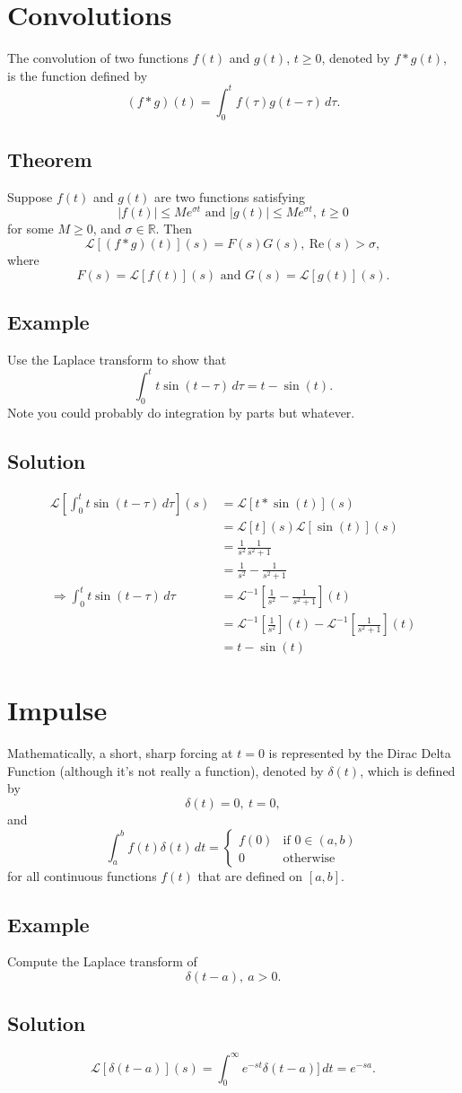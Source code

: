 \documentclass[11pt]{article}
\newcommand{\reals}{\mathbb{R}}
\newcommand{\Laplace}{\mathscr{L}}
\begin{document}
\section{Convolutions}
The convolution of two functions $f(t)$ and $g(t)$, $t \geq 0$, denoted by $f*g(t)$, is the function defined by
\[ (f*g)(t) = \int_0^t f(\tau) g(t - \tau)\, d\tau . \]

\subsection{Theorem}
Suppose $f(t)$ and $g(t)$ are two functions satisfying
\[ |f(t)| \leq Me^{\sigma t} \text{ and } |g(t)| \leq Me^{\sigma t},\ t \geq 0 \]
for some $M \geq 0$, and $\sigma \in \reals$. Then
\[ \Laplace[(f*g)(t)](s) = F(s)G(s),\ \text{Re}(s) > \sigma, \]
where
\[ F(s) = \Laplace[f(t)](s) \text{ and } G(s) = \Laplace[g(t)](s) . \]

\subsection{Example}
Use the Laplace transform to show that
\[ \int_0^t t\sin(t - \tau) \, d\tau = t - \sin(t). \]
Note you could probably do integration by parts but whatever.

\subsection*{Solution}
\begin{align*}
\Laplace \left[ \int_0^t t\sin(t - \tau) \, d\tau \right](s) &= \Laplace[t * \sin(t)](s) \\
&= \Laplace[t](s) \Laplace[\sin(t)](s) \\
&= \frac{1}{s^2}\frac{1}{s^2 + 1} \\
&= \frac{1}{s^2} - \frac{1}{s^2+1} \\
\Rightarrow \int_0^t t\sin(t - \tau) \, d\tau &= \Laplace^{-1} \left[ \frac{1}{s^2} - \frac{1}{s^2+1} \right](t) \\
&= \Laplace^{-1}\left[ \frac{1}{s^2} \right](t) - \Laplace^{-1}\left[ \frac{1}{s^2 + 1} \right](t) \\
&= t - \sin(t)
\end{align*}

\section{Impulse}
Mathematically, a short, sharp forcing at $t=0	$ is represented by the Dirac Delta Function (although it's not really a function), denoted by $\delta(t)$, which is defined by
\[ \delta(t) = 0,\ t=0, \]
and
\[ \int_a^b f(t) \delta(t)\, dt = \begin{cases}
f(0) &\text{if } 0 \in (a, b) \\
0 &\text{otherwise} 
\end{cases} \]
for all continuous functions $f(t)$ that are defined on $[a, b]$.

\subsection{Example}
Compute the Laplace transform of
\[ \delta(t - a),\ a > 0. \]

\subsection*{Solution}
\[ \Laplace[\delta(t - a)](s) = \int_0^\infty e^{-st} \delta(t - a)]\, dt = e^{-sa}. \]
\end{document}

